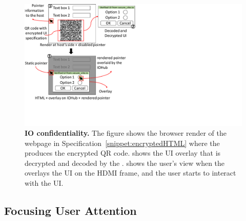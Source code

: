 \begin{figure}[t]
\centering
\includegraphics[trim={0 4cm 16.5cm 0}, clip, width=0.8\linewidth]{chapters/ProtectIOn/images/activityPrivacyRender.pdf}
\caption[\name IO confidentiality]{\textbf{\name IO confidentiality.} The figure shows \one the browser render of the webpage in Specification~\ref{snippet:encryptedHTML} where the \name \js produces the encrypted QR code. \two shows the UI overlay that is decrypted and decoded by the \device. \three shows the user's view when the \device overlays the UI on the HDMI frame, and the user starts to interact with the UI.}
\label{fig:activityPrivacy}
\centering
\end{figure}

\subsection{Focusing User Attention} 
\label{sec:confidentiality:SAS}

